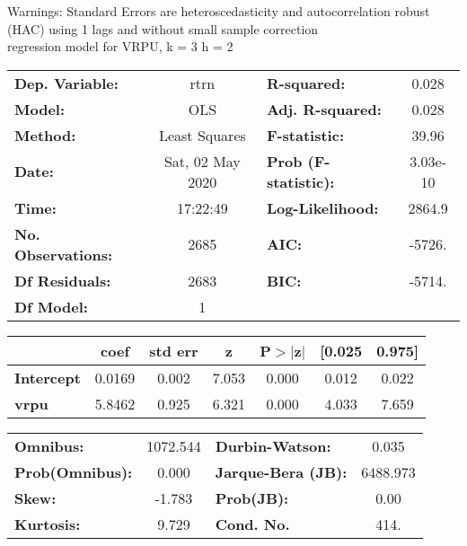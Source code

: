 Warnings: \newline
 [1] Standard Errors are heteroscedasticity and autocorrelation robust (HAC) using 1 lags and without small sample correction\\ 

regression model for VRPU, k = 3 h = 2\begin{center}
\begin{tabular}{lclc}
\toprule
\textbf{Dep. Variable:}    &       rtrn       & \textbf{  R-squared:         } &     0.028   \\
\textbf{Model:}            &       OLS        & \textbf{  Adj. R-squared:    } &     0.028   \\
\textbf{Method:}           &  Least Squares   & \textbf{  F-statistic:       } &     39.96   \\
\textbf{Date:}             & Sat, 02 May 2020 & \textbf{  Prob (F-statistic):} &  3.03e-10   \\
\textbf{Time:}             &     17:22:49     & \textbf{  Log-Likelihood:    } &    2864.9   \\
\textbf{No. Observations:} &        2685      & \textbf{  AIC:               } &    -5726.   \\
\textbf{Df Residuals:}     &        2683      & \textbf{  BIC:               } &    -5714.   \\
\textbf{Df Model:}         &           1      & \textbf{                     } &             \\
\bottomrule
\end{tabular}
\begin{tabular}{lcccccc}
                   & \textbf{coef} & \textbf{std err} & \textbf{z} & \textbf{P$> |$z$|$} & \textbf{[0.025} & \textbf{0.975]}  \\
\midrule
\textbf{Intercept} &       0.0169  &        0.002     &     7.053  &         0.000        &        0.012    &        0.022     \\
\textbf{vrpu}      &       5.8462  &        0.925     &     6.321  &         0.000        &        4.033    &        7.659     \\
\bottomrule
\end{tabular}
\begin{tabular}{lclc}
\textbf{Omnibus:}       & 1072.544 & \textbf{  Durbin-Watson:     } &    0.035  \\
\textbf{Prob(Omnibus):} &   0.000  & \textbf{  Jarque-Bera (JB):  } & 6488.973  \\
\textbf{Skew:}          &  -1.783  & \textbf{  Prob(JB):          } &     0.00  \\
\textbf{Kurtosis:}      &   9.729  & \textbf{  Cond. No.          } &     414.  \\
\bottomrule
\end{tabular}
\end{center}

